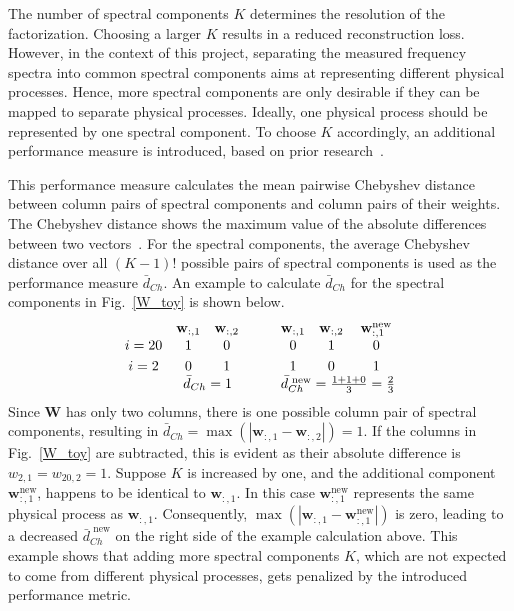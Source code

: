 \documentclass[lettersize,journal]{IEEEtran}
\begin{document}
The number of spectral components $K$ determines the resolution of the factorization. 
Choosing a larger $K$ results in a reduced reconstruction loss.
However, in the context of this project, separating the measured frequency spectra into common spectral components aims at representing different physical processes. Hence, more spectral components are only desirable if they can be mapped to separate physical processes. Ideally, one physical process should be represented by one spectral component. To choose $K$ accordingly, an additional performance measure is introduced, based on prior research~\cite{smets2019evaluation,suresh2014effect}.

This performance measure calculates the mean pairwise Chebyshev distance between column pairs of spectral components and column pairs of their weights. 
The Chebyshev distance shows the maximum value of the absolute differences between two vectors~\cite{Cantrell2000}.
For the spectral components, the average Chebyshev distance over all $(K-1)!$ possible pairs of spectral components is used as the performance measure $\bar{d}_{Ch}$. 
An example to calculate $\bar{d}_{Ch}$ for the spectral components in Fig.~\ref{W_toy} is shown below.
\begin{align*}
\begin{matrix}  
        & \mathbf{w}_{:,1}   & \mathbf{w}_{:,2}   &&  & \mathbf{w}_{:,1}   &\mathbf{w}_{:,2}    &\mathbf{w}_{:,1}^{\text{new}}\\ 
i={20}  & 1     &  0                            &&  & 0     &1      &0\\[1mm]
i=2     & 0     &  1                            &&  & 1     &0      &1\\ 
 & \multicolumn{2}{c}{\bar{d}_{Ch}=1}           &&  &  \multicolumn{3}{c}{\bar{d}_{Ch}^{\text{ new}}=\frac{1+1+0}{3}=\frac{2}{3}}
\end{matrix}
\end{align*}
Since $\mathbf{W}$ has only two columns, there is one possible column pair of spectral components, resulting in $\bar{d}_{Ch}=\max(|\mathbf{w}_{:,1} -\mathbf{w}_{:,2}|)=1$.
If the columns in Fig.~\ref{W_toy} are subtracted, this is evident as their absolute difference is $w_{2,1}=w_{20,2}=1$.
Suppose $K$ is increased by one, and the additional component $\mathbf{w}_{:,1}^{\text{new}}$, happens to be identical to $\mathbf{w}_{:,1}$.
In this case $\mathbf{w}_{:,1}^{\text{new}}$ represents the same physical process as $\mathbf{w}_{:,1}$.
Consequently, $\max(|\mathbf{w}_{:,1} - \mathbf{w}_{:,1}^{\text{new}}|)$ is zero, leading to a decreased $\bar{d}_{Ch}^{\text{ new}}$ on the right side of the example calculation above.
This example shows that adding more spectral components $K$, which are not expected to come from different physical processes, gets penalized by the introduced performance metric.
\end{document}
